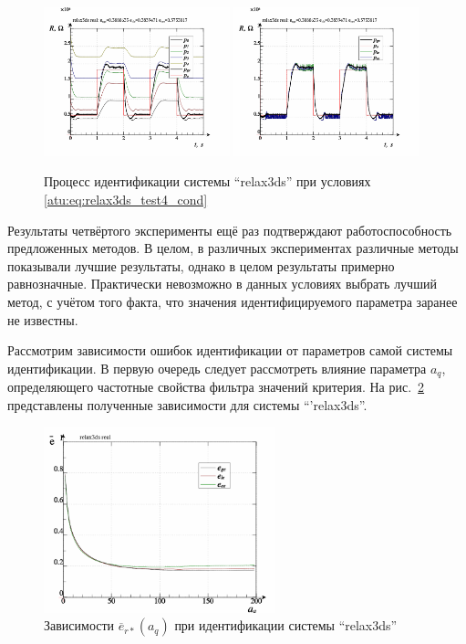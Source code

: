 \begin{figure}[htb!]
  \centerline{
    \includegraphics[width=0.48\textwidth]{p/relax3ds_read_id2_3-p_p.png}
    \hfill
    \includegraphics[width=0.48\textwidth]{p/relax3ds_read_id2_3-p_pp.png}
  }
  \caption{Процесс идентификации системы ``relax3ds'' при условиях \ref{atu:eq:relax3ds_test4_cond}}
  \label{atu:f:relax3ds_id_3}
\end{figure}

Результаты четвёртого эксперименты ещё раз
подтверждают работоспособность предложенных методов.
В целом, в различных экспериментах различные методы
показывали лучшие результаты, однако в целом результаты
примерно равнозначные. Практически невозможно в данных условиях выбрать лучший
метод, с учётом того факта, что значения идентифицируемого
параметра заранее не известны.

Рассмотрим зависимости ошибок идентификации от параметров самой системы идентификации.
В первую очередь следует рассмотреть влияние параметра $a_q$,
определяющего частотные свойства фильтра значений критерия.
На рис.~\ref{atu:f:relax3ds_read_id2_prm_0-p_a_q} представлены полученные зависимости
для системы ``'relax3ds''.

\begin{figure}[htb!]
  \centerline{\includegraphics[width=0.6\textwidth]{p/relax3ds_read_id2_prm_0-p_a_q.png} }
  \caption{Зависимости $\overline{e}_{r*}(a_q)$ при идентификации системы ``relax3ds''}
  \label{atu:f:relax3ds_read_id2_prm_0-p_a_q}
\end{figure}

